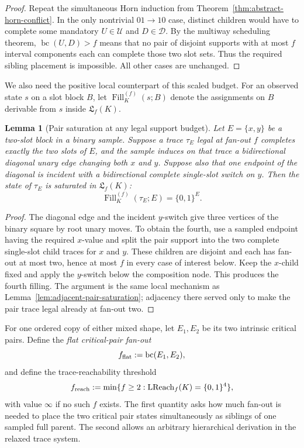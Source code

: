 \documentclass[11pt]{article}
\newtheorem{lemma}[definition]{Lemma}
\begin{document}
\begin{proof}
Repeat the simultaneous Horn induction from
Theorem~\ref{thm:abstract-horn-conflict}.  In the only nontrivial
$01\to10$ case, distinct children would have to complete some mandatory
$U\in\mathcal U$ and $D\in\mathcal D$.  By the multiway scheduling theorem,
$\operatorname{bc}(U,D)>f$ means that no pair of disjoint supports with at
most $f$ interval components each can complete those two slot sets.  Thus the
required sibling placement is impossible.  All other cases are unchanged.
\end{proof}

We also need the positive local counterpart of this scaled budget.  For an
observed state $s$ on a slot block $B$, let
$\operatorname{Fill}^{(f)}_K(s;B)$ denote the assignments on $B$ derivable
from $s$ inside $\mathfrak L_f(K)$.

\begin{lemma}[Pair saturation at any legal support budget]
\label{lem:pair-saturation-any-f}
Let $E=\{x,y\}$ be a two-slot block in a binary sample.  Suppose a trace
$\tau_E$ legal at fan-out $f$ completes exactly the two slots of $E$, and the
sample induces on that trace a bidirectional diagonal unary edge changing both
$x$ and $y$.  Suppose also that one endpoint of the diagonal is incident with
a bidirectional complete single-slot switch on $y$.  Then the state of
$\tau_E$ is saturated in $\mathfrak L_f(K)$:
\[
  \operatorname{Fill}^{(f)}_K(\tau_E;E)=\{0,1\}^E.
\]
\end{lemma}

\begin{proof}
The diagonal edge and the incident $y$-switch give three vertices of the
binary square by root unary moves.  To obtain the fourth, use a sampled
endpoint having the required $x$-value and split the pair support into the two
complete single-slot child traces for $x$ and $y$.  These children are
disjoint and each has fan-out at most two, hence at most $f$ in every case of
interest below.  Keep the $x$-child fixed and apply the $y$-switch below the
composition node.  This produces the fourth filling.  The argument is the
same local mechanism as Lemma~\ref{lem:adjacent-pair-saturation}; adjacency
there served only to make the pair trace legal already at fan-out two.
\end{proof}

For one ordered copy of either mixed shape, let $E_1,E_2$ be its two intrinsic
critical pairs.  Define the \emph{flat critical-pair fan-out}
\[
  f_{\rm flat}:=\operatorname{bc}(E_1,E_2),
\]
and define the trace-reachability threshold
\[
  f_{\rm reach}
  :=\min\{f\ge2:\operatorname{LReach}_f(K)=\{0,1\}^4\},
\]
with value $\infty$ if no such $f$ exists.  The first quantity asks how much
fan-out is needed to place the two critical pair states simultaneously as
siblings of one sampled full parent.  The second allows an arbitrary
hierarchical derivation in the relaxed trace system.
\end{document}

